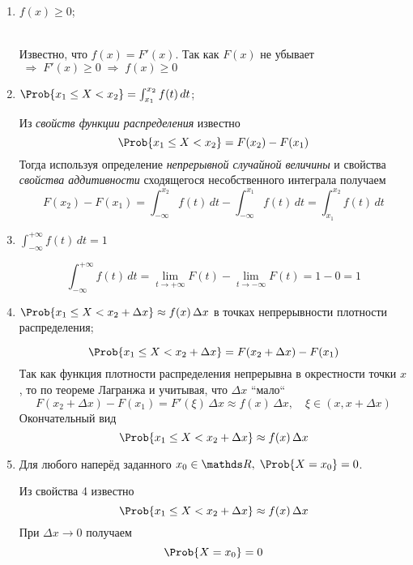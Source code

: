\begin{enumerate}
	\item $f(x) \geq 0$;
	\begin{Proof}\\
		Известно, что $f(x) = F'(x)$. Так как $F(x)$ не убывает $\;\Rightarrow\; F'(x) \geq 0 \;\Rightarrow\; f(x) \geq 0$\\
	\end{Proof}
	
	\item $\Prob\{x_1 \leq X < x_2\} = \int_{x_1}^{x_2} f(t)\,dt$;
	\begin{Proof}
		Из \textit{свойств функции распределения} известно 
		\[
			\Prob\{x_1 \leq X < x_2\} = F(x_2) - F(x_1)
		\]
		Тогда используя определение \textit{непрерывной случайной величины} и свойства \textit{свойства аддитивности} сходящегося несобственного интеграла получаем
		\[
			F(x_2) - F(x_1) = \int_{-\infty}^{x_2} f(t)\,dt - \int_{-\infty}^{x_1} f(t)\,dt = \int_{x_1}^{x_2} f(t)\,dt
		\]
	\end{Proof}
	
	\item $\int_{-\infty}^{+\infty} f(t)\,dt = 1$
	\begin{Proof}
		\[
			\int_{-\infty}^{+\infty} f(t)\,dt = \lim\limits_{t \to +\infty}F(t) - \lim\limits_{t \to -\infty}F(t) = 1 - 0 = 1
		\]
	\end{Proof}
	
	\item $\Prob\{x_1 \leq X < x_2 + \Delta x\} \approx f(x)\,\Delta x$ в точках непрерывности плотности распределения;
	\begin{Proof}
		\[
			\Prob\{x_1 \leq X < x_2 + \Delta x\} = F(x_2 + \Delta x) - F(x_1)
		\]
		Так как функция плотности распределения непрерывна в окрестности точки $x$, то по теореме Лагранжа и учитывая, что $\Delta x$ ``мало`` 
		\[
			F(x_2 + \Delta x) - F(x_1) = F'(\xi)\,\Delta x \approx f(x)\,\Delta x, \quad \xi \in (x, x + \Delta x)
		\]
		Окончательный вид
		\[
			\Prob\{x_1 \leq X < x_2 + \Delta x\} \approx f(x)\,\Delta x
		\]
	\end{Proof}
	
	\item Для любого наперёд заданного $x_0 \in \Re,\; \Prob\{X = x_0\} = 0$.
	\begin{Proof}
		Из свойства 4 известно
		\[
			\Prob\{x_1 \leq X < x_2 + \Delta x\} \approx f(x)\,\Delta x
		\]
		При $\Delta x \to 0$ получаем
		\[
			\Prob\{X = x_0\} = 0
		\]
	\end{Proof}
\end{enumerate}


